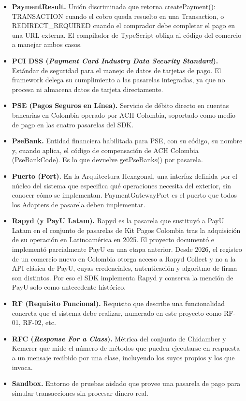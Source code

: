 \begin{itemize}
    \item \textbf{PaymentResult.} Unión discriminada que retorna createPayment(): TRANSACTION cuando el cobro queda resuelto en una Transaction, o REDIRECT\_REQUIRED cuando el comprador debe completar el pago en una URL externa. El compilador de TypeScript obliga al código del comercio a manejar ambos casos.
    \item \textbf{PCI DSS (\textit{Payment Card Industry Data Security Standard}).} Estándar de seguridad para el manejo de datos de tarjetas de pago. El framework delega su cumplimiento a las pasarelas integradas, ya que no procesa ni almacena datos de tarjeta directamente.
    \item \textbf{PSE (Pagos Seguros en Línea).} Servicio de débito directo en cuentas bancarias en Colombia operado por ACH Colombia, soportado como medio de pago en las cuatro pasarelas del SDK.
    \item \textbf{PseBank.} Entidad financiera habilitada para PSE, con su código, su nombre y, cuando aplica, el código de compensación de ACH Colombia (PseBankCode). Es lo que devuelve getPseBanks() por pasarela.
    \item \textbf{Puerto (Port).} En la Arquitectura Hexagonal, una interfaz definida por el núcleo del sistema que especifica qué operaciones necesita del exterior, sin conocer cómo se implementan. PaymentGatewayPort es el puerto que todos los Adapters de pasarela deben implementar.
    \item \textbf{Rapyd (y PayU Latam).} Rapyd es la pasarela que sustituyó a PayU Latam en el conjunto de pasarelas de Kit Pagos Colombia tras la adquisición de su operación en Latinoamérica en 2025. El proyecto documentó e implementó parcialmente PayU en una etapa anterior. Desde 2026, el registro de un comercio nuevo en Colombia otorga acceso a Rapyd Collect y no a la API clásica de PayU, cuyas credenciales, autenticación y algoritmo de firma son distintos. Por eso el SDK implementa Rapyd y conserva la mención de PayU solo como antecedente histórico.
    \item \textbf{RF (Requisito Funcional).} Requisito que describe una funcionalidad concreta que el sistema debe realizar, numerado en este proyecto como RF-01, RF-02, etc.
    \item \textbf{RFC (\textit{Response For a Class}).} Métrica del conjunto de Chidamber y Kemerer que mide el número de métodos que pueden ejecutarse en respuesta a un mensaje recibido por una clase, incluyendo los suyos propios y los que invoca.
    \item \textbf{Sandbox.} Entorno de pruebas aislado que provee una pasarela de pago para simular transacciones sin procesar dinero real.

\end{itemize}
